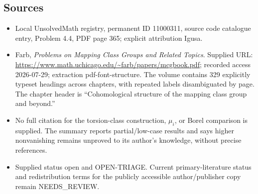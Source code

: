 \documentclass[11pt]{article}
\begin{document}
\subsection{Sources}
\begin{itemize}
\item Local UnsolvedMath registry, permanent ID 11000311, source code catalogue entry, Problem 4.4, PDF page 365; explicit attribution Igusa.
\item Farb, \emph{Problems on Mapping Class Groups and Related Topics}. Supplied URL: \url{https://www.math.uchicago.edu/~farb/papers/mcgbook.pdf}; recorded access 2026-07-29; extraction pdf-font-structure. The volume contains 329 explicitly typeset headings across chapters, with repeated labels disambiguated by page. The chapter header is ``Cohomological structure of the mapping class group and beyond.''
\item No full citation for the torsion-class construction, \(\mu_i\), or Borel comparison is supplied. The summary reports partial/low-case results and says higher nonvanishing remains unproved to its author's knowledge, without precise references.
\item Supplied status open and OPEN-TRIAGE. Current primary-literature status and redistribution terms for the publicly accessible author/publisher copy remain NEEDS\_REVIEW.
\end{itemize}
\end{document}

